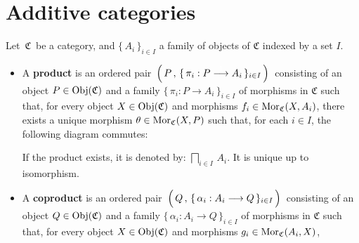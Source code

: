 

\section{Additive categories}
\setcounter{theorem}{0}
\setcounter{equation}{0}


\renewcommand{\theenumi}{\roman{enumi}}
\renewcommand{\labelenumi}{\textnormal{(\theenumi)}$\;\;$}


\begin{definition}
\mbox{}
\vskip 0.15cm
\noindent
Let \,$\mathfrak{C}$\, be a category, and
$\{\,A_{i}\,\}_{i \in I}$ a family of objects of $\mathfrak{C}$ indexed by a set $I$.
\begin{itemize}
\item
	A \textbf{product} is an ordered pair
	\,$\left(\,P\,,\,\{\,\pi_{i} : P \overset{{\color{white}1}}{\longrightarrow} A_{i}\,\}_{i \in I}\,\right)$\,
	consisting of an object $P \in \textnormal{Obj}(\mathfrak{C})$ and a family 
	$\{\,\pi_{i} : P \longrightarrow A_{i}\,\}_{i \in I}$ of morphisms in $\mathfrak{C}$
	such that,
	for every object $X \in \textnormal{Obj}(\mathfrak{C})$ and morphisms $f_{i} \in \textnormal{Mor}_{\mathfrak{C}}(X,A_{i})$,
	there exists a unique morphism $\theta \in \textnormal{Mor}_{\mathfrak{C}}(X,P)$ such that,
	for each $i \in I$, the following diagram commutes:
	\begin{center}
	\end{center}
	If the product exists, it is denoted by: $\underset{i \in I}{\bigsqcap}\,A_{i}$.
	It is unique up to isomorphism.
\item
	A \textbf{coproduct} is an ordered pair
	\,$\left(\,Q\,,\,\{\,\alpha_{i} : A_{i} \overset{{\color{white}1}}{\longrightarrow} Q\,\}_{i \in I}\,\right)$\,
	consisting of an object $Q \in \textnormal{Obj}(\mathfrak{C})$ and a family 
	$\{\,\alpha_{i} : A_{i} \longrightarrow Q\,\}_{i \in I}$ of morphisms in $\mathfrak{C}$
	such that,
	for every object $X \in \textnormal{Obj}(\mathfrak{C})$ and morphisms $g_{i} \in \textnormal{Mor}_{\mathfrak{C}}(A_{i},X)$,

\end{itemize}
\end{definition}
